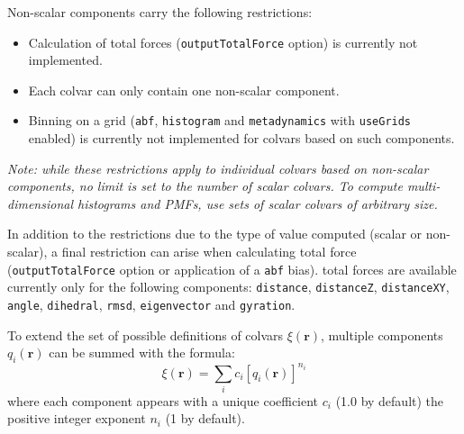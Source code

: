 Non-scalar components carry the following restrictions:
\begin{itemize}
\item Calculation of total forces (\texttt{outputTotalForce} option)
  is currently not implemented.
\item Each colvar can only contain one non-scalar component.
\item Binning on a grid (\texttt{abf}, \texttt{histogram} and
  \texttt{metadynamics} with \texttt{useGrids} enabled) is currently
  not implemented for colvars based on such components.
\end{itemize}

\emph{Note: while these restrictions apply to individual colvars based
  on non-scalar components, no limit is set to the number of scalar
  colvars.  To compute multi-dimensional histograms and PMFs, use sets
  of scalar colvars of arbitrary size.}


In addition to the restrictions due to the type of value computed (scalar or non-scalar),
a final restriction can arise when calculating total force
(\texttt{outputTotalForce} option or application of a \texttt{abf}
bias).  total forces are available currently only for the following
components: \texttt{distance}, \texttt{distanceZ},
\texttt{distanceXY}, \texttt{angle}, \texttt{dihedral}, \texttt{rmsd},
\texttt{eigenvector} and \texttt{gyration}.




To extend the set of possible definitions of colvars $\xi(\mathbf{r})$, multiple components
$q_i(\mathbf{r})$ can be summed with the formula:
\begin{equation}
  \label{eq:colvar_combination}
  \xi(\mathbf{r}) = \sum_i c_i [q_i(\mathbf{r})]^{n_i}
\end{equation}
where each component appears with a unique coefficient $c_i$ (1.0 by
default) the positive integer exponent $n_i$ (1 by default).

